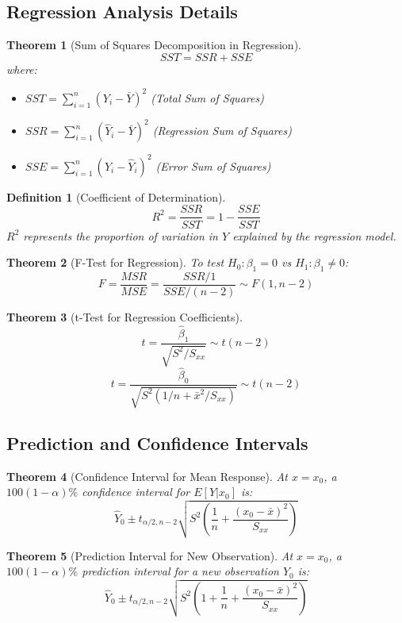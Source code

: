 \documentclass[12pt,a4paper]{amsart}
\newtheorem{theorem}{Theorem}[section]
\newtheorem{definition}{Definition}[section]
\theoremstyle{remark}
\begin{document}
\subsection{Regression Analysis Details}

\begin{theorem}[Sum of Squares Decomposition in Regression]
$$SST = SSR + SSE$$
where:
\begin{itemize}
\item $SST = \sum_{i=1}^n (Y_i - \bar{Y})^2$ (Total Sum of Squares)
\item $SSR = \sum_{i=1}^n (\hat{Y}_i - \bar{Y})^2$ (Regression Sum of Squares)
\item $SSE = \sum_{i=1}^n (Y_i - \hat{Y}_i)^2$ (Error Sum of Squares)
\end{itemize}
\end{theorem}

\begin{definition}[Coefficient of Determination]
$$R^2 = \frac{SSR}{SST} = 1 - \frac{SSE}{SST}$$
$R^2$ represents the proportion of variation in $Y$ explained by the regression model.
\end{definition}

\begin{theorem}[F-Test for Regression]
To test $H_0: \beta_1 = 0$ vs $H_1: \beta_1 \neq 0$:
$$F = \frac{MSR}{MSE} = \frac{SSR/1}{SSE/(n-2)} \sim F(1, n-2)$$
\end{theorem}

\begin{theorem}[t-Test for Regression Coefficients]
$$t = \frac{\hat{\beta}_1}{\sqrt{S^2/S_{xx}}} \sim t(n-2)$$
$$t = \frac{\hat{\beta}_0}{\sqrt{S^2(1/n + \bar{x}^2/S_{xx})}} \sim t(n-2)$$
\end{theorem}

\subsection{Prediction and Confidence Intervals}

\begin{theorem}[Confidence Interval for Mean Response]
At $x = x_0$, a $100(1-\alpha)\%$ confidence interval for $E[Y|x_0]$ is:
$$\hat{Y}_0 \pm t_{\alpha/2, n-2} \sqrt{S^2\left(\frac{1}{n} + \frac{(x_0-\bar{x})^2}{S_{xx}}\right)}$$
\end{theorem}

\begin{theorem}[Prediction Interval for New Observation]
At $x = x_0$, a $100(1-\alpha)\%$ prediction interval for a new observation $Y_0$ is:
$$\hat{Y}_0 \pm t_{\alpha/2, n-2} \sqrt{S^2\left(1 + \frac{1}{n} + \frac{(x_0-\bar{x})^2}{S_{xx}}\right)}$$
\end{theorem}
\end{document}

